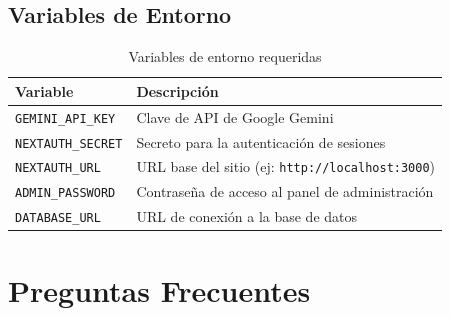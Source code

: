 \documentclass[12pt, a4paper, oneside]{book}
\begin{document}
\section{Variables de Entorno}

\begin{table}[H]
\centering
\renewcommand{\arraystretch}{1.3}
\begin{tabularx}{\textwidth}{l X}
    \toprule
    \textbf{Variable} & \textbf{Descripción} \\
    \midrule
    \texttt{GEMINI\_API\_KEY} & Clave de API de Google Gemini \\
    \texttt{NEXTAUTH\_SECRET} & Secreto para la autenticación de sesiones \\
    \texttt{NEXTAUTH\_URL} & URL base del sitio (ej: \texttt{http://localhost:3000}) \\
    \texttt{ADMIN\_PASSWORD} & Contraseña de acceso al panel de administración \\
    \texttt{DATABASE\_URL} & URL de conexión a la base de datos \\
    \bottomrule
\end{tabularx}
\caption{Variables de entorno requeridas}
\end{table}


\chapter{Preguntas Frecuentes}
\end{document}
